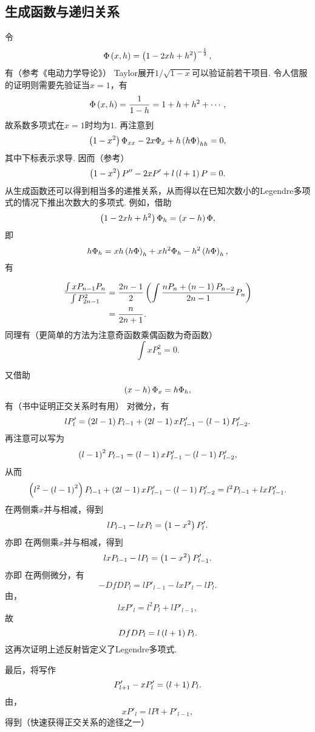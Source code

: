 \documentclass[UTF-8]{ctexart}
\begin{document}
  \subsection{生成函数与递归关系}
  令
  \[ \Phi\left(x,h\right) = \left(1-2xh+h^2\right)^{-\frac{1}{2}}, \]
  有（参考《电动力学导论》）
  Taylor展开$1/\sqrt{1-x}$可以验证前若干项目. 令人信服的证明则需要先验证当$x=1$，有
  \[ \Phi\left(x,h\right) = \frac{1}{1-h} = 1+h+h^2+\cdots, \]
  故系数多项式在$x=1$时均为$1$. 再注意到
  \[ \left(1-x^2\right)\Phi_{xx}-2x\Phi_x+h\left(h\Phi\right)_{hh} = 0, \]
  其中下标表示求导. 因而（参考）
  \[ \left(1-x^2\right)P'' -2xP' + l\left(l+1\right)P = 0. \]
  从生成函数还可以得到相当多的递推关系，从而得以在已知次数小的Legendre多项式的情况下推出次数大的多项式. 例如，借助
  \[ \left(1-2xh+h^2\right)\Phi_h = \left(x-h\right)\Phi, \]
  即
  \[ h\Phi_h = xh\left(h\Phi\right)_h + xh^2\Phi_h-h^2\left(h\Phi\right)_h, \]
  有
  \begin{ex}
    \label{ex:xpp}
    \begin{align*}
      \frac{\int xP_{n-1}P_n}{\int P_{2n-1}^2} &= \frac{2n-1}{2}\left(\int\frac{nP_n+\left(n-1\right)P_{n-2}}{2n-1}P_n\right) \\
      &= \frac{n}{2n+1}.
    \end{align*}
    同理有（更简单的方法为注意奇函数乘偶函数为奇函数）
    \[ \int xP_n^2 = 0. \]
  \end{ex}
  又借助
  \[ \left(x-h\right)\Phi_x = h\Phi_h, \]
  有（书中证明正交关系时有用）
  对微分，有
  \[ lP'_l = \left(2l-1\right)P_{l-1} + \left(2l-1\right)xP'_{l-1}-\left(l-1\right)P'_{l-2}. \]
  再注意可以写为
  \[ \left(l-1\right)^2P_{l-1} = \left(l-1\right)xP'_{l-1}-\left(l-1\right)P'_{l-2}, \]
  从而
  \[ \left(l^2-\left(l-1\right)^2\right)P_{l-1} + \left(2l-1\right)xP'_{l-1}-\left(l-1\right)P'_{l-2} = l^2P_{l-1}+lxP'_{l-1}. \]
  在两侧乘$x$并与相减，得到
  \[ lP_{l-1} - lxP_l = \left(1-x^2\right)P'_l. \]
  亦即
  在两侧乘$x$并与相减，得到
  \[ lxP_{l-1} - lP_l= \left(1-x^2\right)P'_{l-1}. \]
  亦即
  在两侧微分，有
  \[ -DfDP_l = lP'_{l-1} - lxP'_l - lP_l. \]
  由，
  \[ lxP'_l = l^2P_l+lP'_{l-1}, \]
  故
  \[ DfDP_l = l\left(l+1\right)P_l. \]
  这再次证明上述反射皆定义了Legendre多项式.
  \par
  最后，将写作
  \[ P'_{l+1} - xP'_l = \left(l+1\right)P_l. \]
  由，
  \[ xP'_l = lPl + P'_{l-1}, \]
  得到（快速获得正交关系的途径之一）
\end{document}
